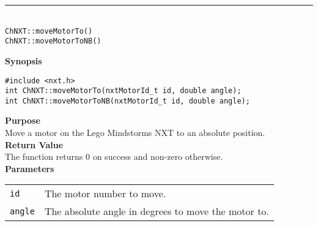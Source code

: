 \noindent
\vspace{5pt}
\rule{4.5in}{0.015in}\\
\noindent
{\LARGE \texttt{ChNXT::moveMotorTo()} }\\
{\LARGE \texttt{ChNXT::moveMotorToNB()} }\\


\noindent
{\bf Synopsis}
\begin{lstlisting}
#include <nxt.h>
int ChNXT::moveMotorTo(nxtMotorId_t id, double angle);
int ChNXT::moveMotorToNB(nxtMotorId_t id, double angle);
\end{lstlisting}

\noindent
{\bf Purpose}\\
Move a motor on the Lego Mindstorms NXT to an absolute position.\\

\noindent
{\bf Return Value}\\
The function returns 0 on success and non-zero otherwise.\\

\noindent
{\bf Parameters}\\
\vspace{-0.1in}
\begin{description}
\item               
\begin{tabular}{p{10 mm}p{145 mm}}
\texttt{id} & The motor number to move. \\
\texttt{angle}&The absolute angle in degrees to move the motor to.\\
\end{tabular}
\end{description}

